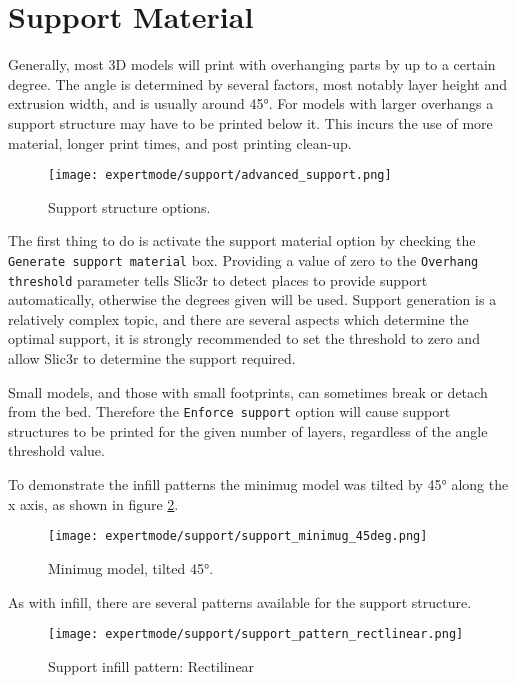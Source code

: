\section{Support Material} %
\label{sec:support}

Generally, most 3D models will print with overhanging parts by up to a certain degree.  The angle is determined by several factors, most notably layer height and extrusion width, and is usually around 45°.  For models with larger overhangs a support structure may have to be printed below it.  This incurs the use of more material, longer print times, and post printing clean-up.

\begin{figure}[H]
\centering
\texttt{[image: expertmode/support/advanced\_support.png]}
\caption{Support structure options.}
\label{fig:advanced_support}
\end{figure}

The first thing to do is activate the support material option by checking the \texttt{Generate support material} box.  Providing a value of zero to the \texttt{Overhang threshold} parameter tells Slic3r to detect places to provide support automatically, otherwise the degrees given will be used.  Support generation is a relatively complex topic, and there are several aspects which determine the optimal support, it is strongly recommended to set the threshold to zero and allow Slic3r to determine the support required.

Small models, and those with small footprints, can sometimes break or detach from the bed.  Therefore the \texttt{Enforce support} option will cause support structures to be printed for the given number of layers, regardless of the angle threshold value.

To demonstrate the infill patterns the minimug model was tilted by 45° along the x axis, as shown in figure \ref{fig:support_minimug_45deg}.

\begin{figure}[H]
\centering
\texttt{[image: expertmode/support/support\_minimug\_45deg.png]}
\caption{Minimug model, tilted 45°.}
\label{fig:support_minimug_45deg}
\end{figure}

As with infill, there are several patterns available for the support structure.

\begin{figure}[H]
\centering
\texttt{[image: expertmode/support/support\_pattern\_rectlinear.png]}
\caption{Support infill pattern: Rectilinear}
\label{fig:support_pattern_rectlinear}
\end{figure}

